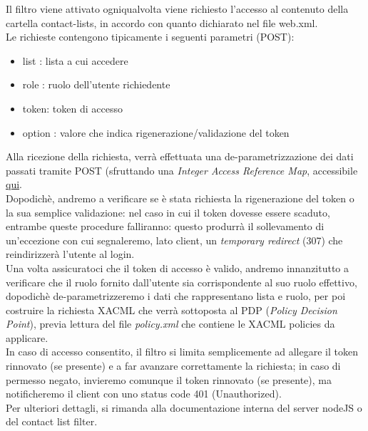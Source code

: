 Il filtro viene attivato ogniqualvolta viene richiesto l'accesso al contenuto della cartella contact-lists, in accordo con quanto dichiarato nel file web.xml.\\
Le richieste contengono tipicamente i seguenti parametri (POST):
\begin{itemize}
\item list : lista a cui accedere
\item role : ruolo dell'utente richiedente
\item token: token di accesso
\item option : valore che indica rigenerazione/validazione del token
\end{itemize}
Alla ricezione della richiesta, verrà effettuata una de-parametrizzazione dei dati passati tramite POST (sfruttando una \textit{Integer Access Reference Map}, accessibile \href{https://static.javadoc.io/org.owasp.esapi/esapi/2.0.1/org/owasp/esapi/AccessReferenceMap.html}{qui}.\\
Dopodichè, andremo a verificare se è stata richiesta la rigenerazione del token o la sua semplice validazione: nel caso in cui il token dovesse essere scaduto, entrambe queste procedure falliranno: questo produrrà il sollevamento di un'eccezione con cui segnaleremo, lato client, un \textit{temporary redirect} (307) che reindirizzerà l'utente al login.\\
Una volta assicuratoci che il token di accesso è valido, andremo innanzitutto a verificare che il ruolo fornito dall'utente sia corrispondente al suo ruolo effettivo, dopodichè de-parametrizzeremo i dati che rappresentano lista e ruolo, per poi costruire la richiesta XACML che verrà sottoposta al PDP (\textit{Policy Decision Point}), previa lettura del file \textit{policy.xml} che contiene le XACML policies da applicare.\\
In caso di accesso consentito, il filtro si limita semplicemente ad allegare il token rinnovato (se presente) e a far avanzare correttamente la richiesta; in caso di permesso negato, invieremo comunque il token rinnovato (se presente), ma notificheremo il client con uno status code 401 (Unauthorized).\\

Per ulteriori dettagli, si rimanda alla documentazione interna del server nodeJS o del contact list filter.\\